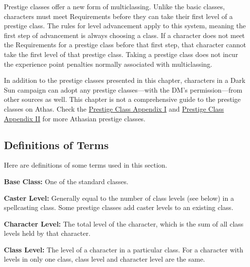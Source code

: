 Prestige classes offer a new form of multiclassing. Unlike the basic classes, characters must meet Requirements before they can take their first level of a prestige class. The rules for level advancement apply to this system, meaning the first step of advancement is always choosing a class. If a character does not meet the Requirements for a prestige class before that first step, that character cannot take the first level of that prestige class. Taking a prestige class does not incur the experience point penalties normally associated with multiclassing.


In addition to the prestige classes presented in this chapter, characters in a {\tableheader Dark Sun} campaign can adopt any prestige classes---with the DM's permission---from other sources as well. This chapter is not a comprehensive guide to the prestige classes on Athas. Check the \href{http://athas.org/products/prc1}{Prestige Class Appendix I} and \href{http://athas.org/products/prc2}{Prestige Class Appendix II} for more Athasian prestige classes.

\subsection{Definitions of Terms}
Here are definitions of some terms used in this section.

\textbf{Base Class:} One of the standard classes.

\textbf{Caster Level:} Generally equal to the number of class levels (see below) in a spellcasting class. Some prestige classes add caster levels to an existing class.

\textbf{Character Level:} The total level of the character, which is the sum of all class levels held by that character.

\textbf{Class Level:} The level of a character in a particular class. For a character with levels in only one class, class level and character level are the same.







% 







